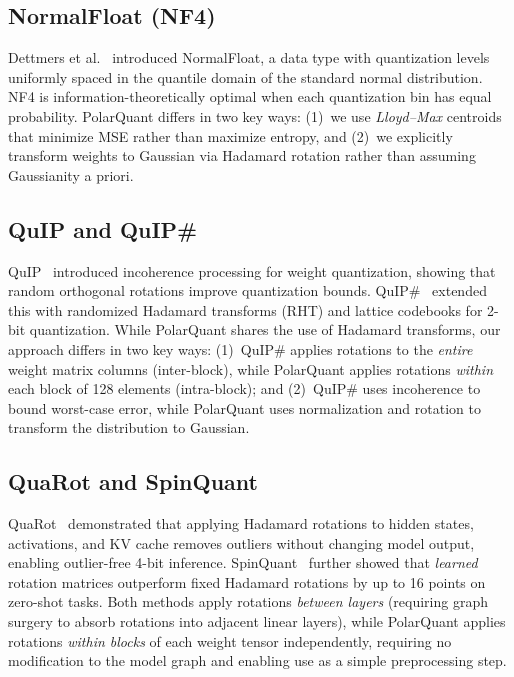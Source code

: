 \documentclass[10pt,twocolumn]{article}
\begin{document}
\subsection{NormalFloat (NF4)}
\label{sec:nf4}

Dettmers et al.~\cite{dettmers2024qlora} introduced NormalFloat, a data type with quantization levels uniformly spaced in the quantile domain of the standard normal distribution. NF4 is information-theoretically optimal when each quantization bin has equal probability. PolarQuant differs in two key ways: (1)~we use \emph{Lloyd--Max} centroids that minimize MSE rather than maximize entropy, and (2)~we explicitly transform weights to Gaussian via Hadamard rotation rather than assuming Gaussianity a priori.

\subsection{QuIP and QuIP\#}
\label{sec:quip}

QuIP~\cite{tseng2024quip_original} introduced incoherence processing for weight quantization, showing that random orthogonal rotations improve quantization bounds. QuIP\#~\cite{chee2024quip} extended this with randomized Hadamard transforms (RHT) and lattice codebooks for 2-bit quantization. While PolarQuant shares the use of Hadamard transforms, our approach differs in two key ways: (1)~QuIP\# applies rotations to the \emph{entire} weight matrix columns (inter-block), while PolarQuant applies rotations \emph{within} each block of 128 elements (intra-block); and (2)~QuIP\# uses incoherence to bound worst-case error, while PolarQuant uses normalization and rotation to transform the distribution to Gaussian.

\subsection{QuaRot and SpinQuant}
\label{sec:quarot}

QuaRot~\cite{ashkboos2024quarot} demonstrated that applying Hadamard rotations to hidden states, activations, and KV cache removes outliers without changing model output, enabling outlier-free 4-bit inference. SpinQuant~\cite{liu2024spinquant} further showed that \emph{learned} rotation matrices outperform fixed Hadamard rotations by up to 16 points on zero-shot tasks. Both methods apply rotations \emph{between layers} (requiring graph surgery to absorb rotations into adjacent linear layers), while PolarQuant applies rotations \emph{within blocks} of each weight tensor independently, requiring no modification to the model graph and enabling use as a simple preprocessing step.
\end{document}
